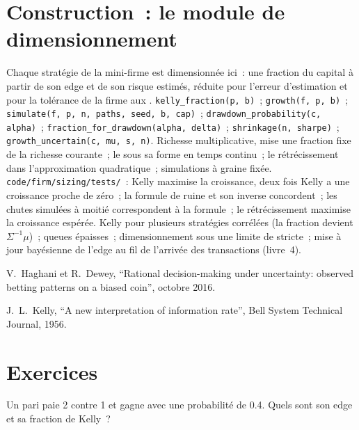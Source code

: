 \section{Construction~: le module de dimensionnement}\label{bld:m2:thinking-in-expected-value:sizing}

\begin{build}
 Chaque stratégie de la mini-firme est dimensionnée ici~: une fraction du capital à
partir de son edge et de son risque estimés, réduite pour l'erreur d'estimation et pour la tolérance
de la firme aux .
 \texttt{kelly\_fraction(p, b)}~; \texttt{growth(f, p, b)}~;
\texttt{simulate(f, p, n, paths, seed, b, cap)}~; \texttt{drawdown\_probability(c,
alpha)}~; \texttt{fraction\_for\_drawdown(alpha, delta)}~; \texttt{shrinkage(n, sharpe)}~;
\texttt{growth\_uncertain(c, mu, s, n)}.
 Richesse multiplicative, mise une fraction fixe de la richesse courante~; le
 sous sa forme en temps continu~; le rétrécissement dans l'approximation
quadratique~; simulations à graine fixée.
 \texttt{code/firm/sizing/tests/}~: Kelly maximise la croissance,
deux fois Kelly a une croissance proche de zéro~; la formule de ruine et son inverse concordent~; les chutes simulées à
moitié correspondent à la formule~; le rétrécissement maximise la croissance espérée.
 Kelly pour plusieurs stratégies corrélées (la fraction devient
$\Sigma^{-1}\mu$)~; queues épaisses~; dimensionnement sous une limite de  stricte~; mise à jour
bayésienne de l'edge au fil de l'arrivée des transactions (livre~4).
\end{build}

\begin{omsources}
\item V.~Haghani et R.~Dewey, ``Rational decision-making under uncertainty: observed
betting patterns on a biased coin'', octobre 2016.
\item J.~L.~Kelly, ``A new interpretation of information rate'', Bell System Technical
Journal, 1956.
\end{omsources}

\section{Exercices}

\begin{exercise}[$\star$]\label{exo:m2:thinking-in-expected-value:1}
Un pari paie 2 contre 1 et gagne avec une probabilité de 0.4. Quels sont son edge et sa fraction de Kelly~?
\end{exercise}

